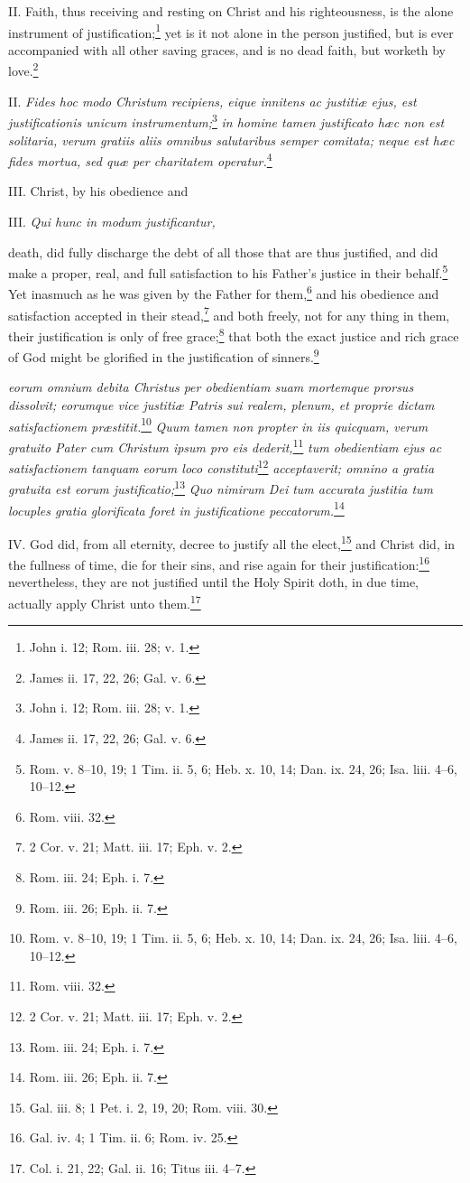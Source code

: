 II. Faith, thus receiving and resting on Christ and his righteousness, is the alone instrument of justification;\footnote{John i. 12; Rom. iii. 28; v. 1.} yet is it not alone in the person justified, but is ever accompanied with all other saving graces, and is no dead faith, but worketh by love.\footnote{James ii. 17, 22, 26; Gal. v. 6.}

II. \emph{Fides hoc modo Christum recipiens, eique innitens ac justitiæ ejus, est justificationis unicum instrumentum;}\footnote{John i. 12; Rom. iii. 28; v. 1.}\emph{ in homine tamen justificato hæc non est solitaria, verum gratiis aliis omnibus salutaribus semper comitata; neque est hæc fides mortua, sed quæ per charitatem operatur.}\footnote{James ii. 17, 22, 26; Gal. v. 6.}

III. Christ, by his obedience and

III. \emph{Qui hunc in modum justificantur, }

death, did fully discharge the debt of all those that are thus justified, and did make a proper, real, and full satisfaction to his Father's justice in their behalf.\footnote{Rom. v. 8–10, 19; 1 Tim. ii. 5, 6; Heb. x. 10, 14; Dan. ix. 24, 26; Isa. liii. 4–6, 10–12.} Yet inasmuch as he was given by the Father for them,\footnote{Rom. viii. 32.} and his obedience and satisfaction accepted in their stead,\footnote{2 Cor. v. 21; Matt. iii. 17; Eph. v. 2.} and both freely, not for any thing in them, their justification is only of free grace;\footnote{Rom. iii. 24; Eph. i. 7.} that both the exact justice and rich grace of God might be glorified in the justification of sinners.\footnote{Rom. iii. 26; Eph. ii. 7.}

\emph{eorum omnium debita Christus per obedientiam suam mortemque prorsus dissolvit; eorumque vice justitiæ Patris sui realem, plenum, et proprie dictam satisfactionem præstitit.}\footnote{Rom. v. 8–10, 19; 1 Tim. ii. 5, 6; Heb. x. 10, 14; Dan. ix. 24, 26; Isa. liii. 4–6, 10–12.}\emph{ Quum tamen non propter in iis quicquam, verum gratuito Pater cum Christum ipsum pro eis dederit,}\footnote{Rom. viii. 32.}\emph{ tum obedientiam ejus ac satisfactionem tanquam eorum loco constituti}\footnote{2 Cor. v. 21; Matt. iii. 17; Eph. v. 2.}\emph{ acceptaverit; omnino a gratia gratuita est eorum justificatio;}\footnote{Rom. iii. 24; Eph. i. 7.}\emph{ Quo nimirum Dei tum accurata justitia tum locuples gratia glorificata foret in justificatione peccatorum.}\footnote{Rom. iii. 26; Eph. ii. 7.}

IV. God did, from all eternity, decree to justify all the elect,\footnote{Gal. iii. 8; 1 Pet. i. 2, 19, 20; Rom. viii. 30.} and Christ did, in the fullness of time, die for their sins, and rise again for their justification:\footnote{Gal. iv. 4; 1 Tim. ii. 6; Rom. iv. 25.} nevertheless, they are not justified until the Holy Spirit doth, in due time, actually apply Christ unto them.\footnote{Col. i. 21, 22; Gal. ii. 16; Titus iii. 4–7.}

